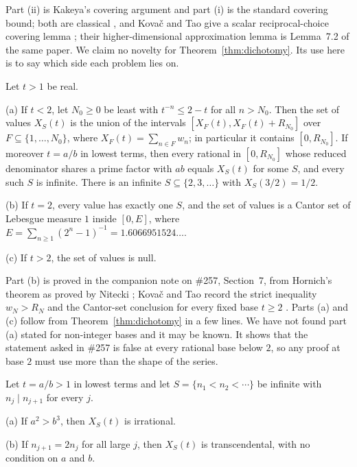 \documentclass[11pt]{article}
\begin{document}
Part (ii) is Kakeya's covering argument and part (i) is the standard covering
bound; both are classical \cite{hornich1941,nitecki2013,fridy1966}, and
Kova\v{c} and Tao give a scalar reciprocal-choice covering lemma
\cite[Lemma~5.1]{kovactao2024}; their higher-dimensional approximation lemma is
Lemma~7.2 of the same paper.  We claim no novelty for
Theorem~\ref{thm:dichotomy}.  Its use here is to say which side each problem
lies on.

\begin{theorem}\label{thm:bases}
Let $t>1$ be real.

\textup{(a)} If $t<2$, let $N_0\ge0$ be least with $t^{-n}\le2-t$ for all
$n>N_0$.  Then the set of values $X_S(t)$ is the union of the intervals
$[X_F(t),X_F(t)+R_{N_0}]$ over $F\subseteq\{1,\dots,N_0\}$, where
$X_F(t)=\sum_{n\in F}w_n$; in particular it contains $[0,R_{N_0}]$.  If moreover
$t=a/b$ in lowest terms, then every rational in $[0,R_{N_0}]$ whose reduced
denominator shares a prime factor with $ab$ equals $X_S(t)$ for some $S$, and
every such $S$ is infinite.  There is an infinite $S\subseteq\{2,3,\dots\}$
with $X_S(3/2)=1/2$.

\textup{(b)} If $t=2$, every value has exactly one $S$, and the set of values
is a Cantor set of Lebesgue measure $1$ inside $[0,E]$, where
$E=\sum_{n\ge1}(2^n-1)^{-1}=1.6066951524\ldots$.

\textup{(c)} If $t>2$, the set of values is null.
\end{theorem}

Part (b) is proved in the companion note on \#257, Section~7, from Hornich's
theorem as proved by Nitecki \cite{plectis257,hornich1941,nitecki2013}; Kova\v{c}
and Tao record the strict inequality $w_N>R_N$ and the Cantor-set conclusion for
every fixed base $t\ge2$ \cite[Remark~4.1]{kovactao2024}.  Parts (a) and (c) follow
from Theorem~\ref{thm:dichotomy} in a few lines.  We have not found part (a)
stated for non-integer bases and it may be known.  It shows that the statement
asked in \#257 is false at every rational base below $2$, so any proof at base
$2$ must use more than the shape of the series.

\begin{theorem}\label{thm:chains}
Let $t=a/b>1$ in lowest terms and let $S=\{n_1<n_2<\cdots\}$ be infinite with
$n_j\mid n_{j+1}$ for every $j$.

\textup{(a)} If $a^2>b^3$, then $X_S(t)$ is irrational.

\textup{(b)} If $n_{j+1}=2n_j$ for all large $j$, then $X_S(t)$ is
transcendental, with no condition on $a$ and $b$.
\end{theorem}
\end{document}
